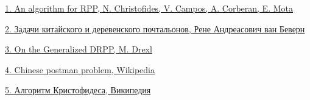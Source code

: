 \href{https://www.researchgate.net/publication/239385320_An_algorithm_for_the_Rural_Postman_Problem}{1. An algorithm for RPP, N. Christofides, V. Campos, A. Corberan, E. Mota}

\href{https://www.researchgate.net/publication/350637355_Zadaci_kitajskogo_i_derevenskogo_poctalonov}{2. Задачи китайского и деревенского почтальонов, Рене Андреасович ван Беверн}

\href{https://logistik.bwl.uni-mainz.de/files/2018/12/LM-2012-03.pdf}{3. On the Generalized DRPP, M. Drexl}

\href{https://en.wikipedia.org/wiki/Chinese_postman_problem}{4. Chinese postman problem, Wikipedia}

\href{https://ru.wikipedia.org/wiki/%D0%90%D0%BB%D0%B3%D0%BE%D1%80%D0%B8%D1%82%D0%BC_%D0%9A%D1%80%D0%B8%D1%81%D1%82%D0%BE%D1%84%D0%B8%D0%B4%D0%B5%D1%81%D0%B0#:~:text=%D0%90%D0%BB%D0%B3%D0%BE%D1%80%D0%B8%D1%82%D0%BC%20%D0%9A%D1%80%D0%B8%D1%81%D1%82%D0%BE%D1%84%D0%B8%D0%B4%D0%B5%D1%81%D0%B0%20%D0%B8%D0%BB%D0%B8%20%D0%B0%D0%BB%D0%B3%D0%BE%D1%80%D0%B8%D1%82%D0%BC%20%D0%9A%D1%80%D0%B8%D1%81%D1%82%D0%BE%D1%84%D0%B8%D0%B4%D0%B5%D1%81%D0%B0,%D1%81%D0%B8%D0%BC%D0%BC%D0%B5%D1%82%D1%80%D0%B8%D1%87%D0%BD%D1%8B%20%D0%B8%20%D1%83%D0%B4%D0%BE%D0%B2%D0%BB%D0%B5%D1%82%D0%B2%D0%BE%D1%80%D1%8F%D1%8E%D1%82%20%D0%BD%D0%B5%D1%80%D0%B0%D0%B2%D0%B5%D0%BD%D1%81%D1%82%D0%B2%D1%83%20%D1%82%D1%80%D0%B5%D1%83%D0%B3%D0%BE%D0%BB%D1%8C%D0%BD%D0%B8%D0%BA%D0%B0).}{5. Алгоритм Кристофидеса, Википедия}
